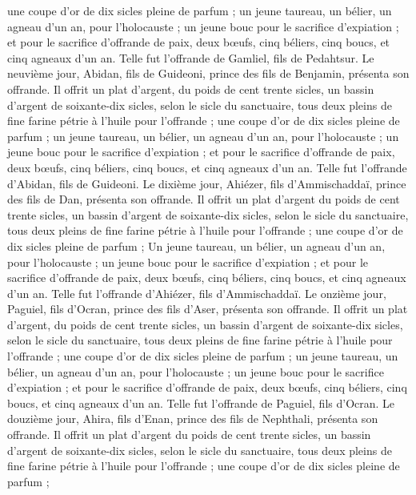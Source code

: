 \begin{multicols}{2}
une coupe d'or de dix sicles pleine de parfum ;
un jeune taureau, un bélier, un agneau d'un an, pour l'holocauste ;
un jeune bouc pour le sacrifice d’expiation ;
et pour le sacrifice d’offrande de paix, deux bœufs, cinq béliers, cinq boucs, et cinq agneaux d'un an. Telle fut l'offrande de Gamliel, fils de Pedahtsur.
Le neuvième jour, Abidan, fils de Guideoni, prince des fils de Benjamin, présenta son offrande.
Il offrit un plat d'argent, du poids de cent trente sicles, un bassin d'argent de soixante-dix sicles, selon le sicle du sanctuaire, tous deux pleins de fine farine pétrie à l'huile pour l’offrande ;
une coupe d'or de dix sicles pleine de parfum ;
un jeune taureau, un bélier, un agneau d'un an, pour l'holocauste ;
un jeune bouc pour le sacrifice d’expiation ;
et pour le sacrifice d’offrande de paix, deux bœufs, cinq béliers, cinq boucs, et cinq agneaux d'un an. Telle fut l'offrande d'Abidan, fils de Guideoni.
Le dixième jour, Ahiézer, fils d’Ammischaddaï, prince des fils de Dan, présenta son offrande.
Il offrit un plat d'argent du poids de cent trente sicles, un bassin d'argent de soixante-dix sicles, selon le sicle du sanctuaire, tous deux pleins de fine farine pétrie à l'huile pour l’offrande ;
une coupe d'or de dix sicles pleine de parfum ;
Un jeune taureau, un bélier, un agneau d'un an, pour l'holocauste ;
un jeune bouc pour le sacrifice d’expiation ;
et pour le sacrifice d’offrande de paix, deux bœufs, cinq béliers, cinq boucs, et cinq agneaux d'un an. Telle fut l'offrande d'Ahiézer, fils d’Ammischaddaï.
Le onzième jour, Paguiel, fils d’Ocran, prince des fils d'Aser, présenta son offrande.
Il offrit un plat d’argent, du poids de cent trente sicles, un bassin d'argent de soixante-dix sicles, selon le sicle du sanctuaire, tous deux pleins de fine farine pétrie à l'huile pour l’offrande ;
une coupe d'or de dix sicles pleine de parfum ;
un jeune taureau, un bélier, un agneau d'un an, pour l'holocauste ;
un jeune bouc pour le sacrifice d’expiation ;
et pour le sacrifice d’offrande de paix, deux bœufs, cinq béliers, cinq boucs, et cinq agneaux d'un an. Telle fut l'offrande de Paguiel, fils d’Ocran.
Le douzième jour, Ahira, fils d’Enan, prince des fils de Nephthali, présenta son offrande.
Il offrit un plat d'argent du poids de cent trente sicles, un bassin d'argent de soixante-dix sicles, selon le sicle du sanctuaire, tous deux pleins de fine farine pétrie à l'huile pour l’offrande ;
une coupe d'or de dix sicles pleine de parfum ;

\end{multicols}
